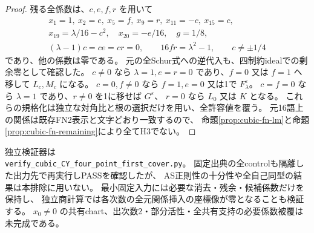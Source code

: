 \begin{proof}
残る全係数は、$c,e,f,r$ を用いて
\[
\begin{gathered}
 x_1=1,\ x_2=e,\ x_5=f,\ x_9=r,\ x_{11}=-c,\ x_{15}=c,\\
 x_{19}=\lambda/16-c^2,\quad x_{20}=-e/16,\quad g=1/8,\\
 (\lambda-1)c=ce=cr=0,\qquad16fr=\lambda^2-1,\qquad c\ne\pm1/4
\end{gathered}
\]
であり、他の係数は零である。
元の全Schur式への逆代入も、四制約idealでの剰余零として確認した。
$c\ne0$ なら $\lambda=1,e=r=0$ であり、$f=0$ 又は $f=1$ へ移して
$L_c,M_c$ になる。
$c=0,f\ne0$ なら $f=1,e=0$ 又は1で $F^\varepsilon_\lambda$。
$c=f=0$ なら $\lambda=1$ であり、$r\ne0$ を1に移せば $G^\varepsilon$、
$r=0$ なら $L_0$ 又は $K$ となる。
これらの規格化は独立な対角比と根の選択だけを用い、全許容値を覆う。
元16語上の関係は既存FN2表示と文字どおり一致するので、
命題\ref{prop:cubic-fn-lm}と命題\ref{prop:cubic-fn-remaining}により全てH3でない。
\end{proof}

独立検証器は\\
\texttt{verify\_cubic\_CY\_four\_point\_first\_cover.py}。
固定出典の全controlも隔離した出力先で再実行しPASSを確認したが、
AS正則性の十分性や全自己同型の結果は本排除に用いない。
最小固定入力には必要な消去・残余・候補係数だけを保持し、
独立商計算では各次数の全元関係挿入の座標像が零となることも検証する。
$x_0\ne0$ の共有chart、出次数2・部分活性・全共有支持の必要係数被覆は未完成である。
